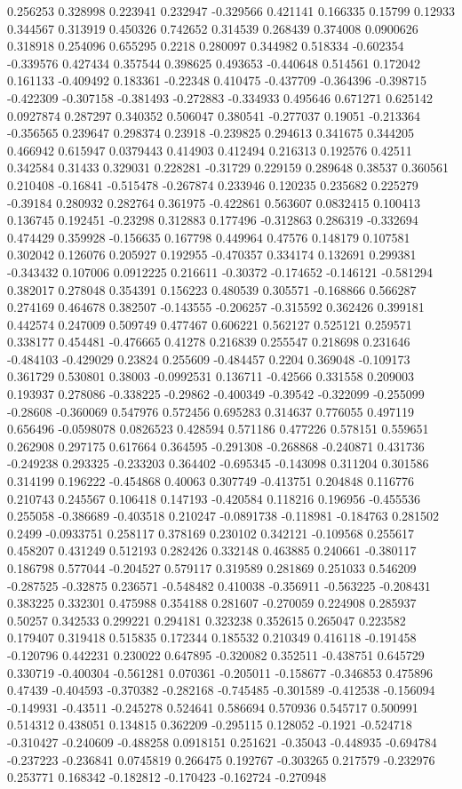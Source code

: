 0.256253 0.328998 0.223941 0.232947 -0.329566 0.421141 0.166335 0.15799 0.12933 0.344567 0.313919 0.450326 0.742652 0.314539 0.268439 0.374008 0.0900626 0.318918 0.254096 0.655295 0.2218 0.280097 0.344982 0.518334 -0.602354 -0.339576 0.427434 0.357544 0.398625 0.493653 -0.440648 0.514561 0.172042 0.161133 -0.409492 0.183361 -0.22348 0.410475 -0.437709 -0.364396 -0.398715 -0.422309 -0.307158 -0.381493 -0.272883 -0.334933 0.495646 0.671271 0.625142 0.0927874 0.287297 0.340352 0.506047 0.380541 -0.277037 0.19051 -0.213364 -0.356565 0.239647 0.298374 0.23918 -0.239825 0.294613 0.341675 0.344205 0.466942 0.615947 0.0379443 0.414903 0.412494 0.216313 0.192576 0.42511 0.342584 0.31433 0.329031 0.228281 -0.31729 0.229159 0.289648 0.38537 0.360561 0.210408 -0.16841 -0.515478 -0.267874 0.233946 0.120235 0.235682 0.225279 -0.39184 0.280932 0.282764 0.361975 -0.422861 0.563607 0.0832415 0.100413 0.136745 0.192451 -0.23298 0.312883 0.177496 -0.312863 0.286319 -0.332694 0.474429 0.359928 -0.156635 0.167798 0.449964 0.47576 0.148179 0.107581 0.302042 0.126076 0.205927 0.192955 -0.470357 0.334174 0.132691 0.299381 -0.343432 0.107006 0.0912225 0.216611 -0.30372 -0.174652 -0.146121 -0.581294 0.382017 0.278048 0.354391 0.156223 0.480539 0.305571 -0.168866 0.566287 0.274169 0.464678 0.382507 -0.143555 -0.206257 -0.315592 0.362426 0.399181 0.442574 0.247009 0.509749 0.477467 0.606221 0.562127 0.525121 0.259571 0.338177 0.454481 -0.476665 0.41278 0.216839 0.255547 0.218698 0.231646 -0.484103 -0.429029 0.23824 0.255609 -0.484457 0.2204 0.369048 -0.109173 0.361729 0.530801 0.38003 -0.0992531 0.136711 -0.42566 0.331558 0.209003 0.193937 0.278086 -0.338225 -0.29862 -0.400349 -0.39542 -0.322099 -0.255099 -0.28608 -0.360069 0.547976 0.572456 0.695283 0.314637 0.776055 0.497119 0.656496 -0.0598078 0.0826523 0.428594 0.571186 0.477226 0.578151 0.559651 0.262908 0.297175 0.617664 0.364595 -0.291308 -0.268868 -0.240871 0.431736 -0.249238 0.293325 -0.233203 0.364402 -0.695345 -0.143098 0.311204 0.301586 0.314199 0.196222 -0.454868 0.40063 0.307749 -0.413751 0.204848 0.116776 0.210743 0.245567 0.106418 0.147193 -0.420584 0.118216 0.196956 -0.455536 0.255058 -0.386689 -0.403518 0.210247 -0.0891738 -0.118981 -0.184763 0.281502 0.2499 -0.0933751 0.258117 0.378169 0.230102 0.342121 -0.109568 0.255617 0.458207 0.431249 0.512193 0.282426 0.332148 0.463885 0.240661 -0.380117 0.186798 0.577044 -0.204527 0.579117 0.319589 0.281869 0.251033 0.546209 -0.287525 -0.32875 0.236571 -0.548482 0.410038 -0.356911 -0.563225 -0.208431 0.383225 0.332301 0.475988 0.354188 0.281607 -0.270059 0.224908 0.285937 0.50257 0.342533 0.299221 0.294181 0.323238 0.352615 0.265047 0.223582 0.179407 0.319418 0.515835 0.172344 0.185532 0.210349 0.416118 -0.191458 -0.120796 0.442231 0.230022 0.647895 -0.320082 0.352511 -0.438751 0.645729 0.330719 -0.400304 -0.561281 0.070361 -0.205011 -0.158677 -0.346853 0.475896 0.47439 -0.404593 -0.370382 -0.282168 -0.745485 -0.301589 -0.412538 -0.156094 -0.149931 -0.43511 -0.245278 0.524641 0.586694 0.570936 0.545717 0.500991 0.514312 0.438051 0.134815 0.362209 -0.295115 0.128052 -0.1921 -0.524718 -0.310427 -0.240609 -0.488258 0.0918151 0.251621 -0.35043 -0.448935 -0.694784 -0.237223 -0.236841 0.0745819 0.266475 0.192767 -0.303265 0.217579 -0.232976 0.253771 0.168342 -0.182812 -0.170423 -0.162724 -0.270948 